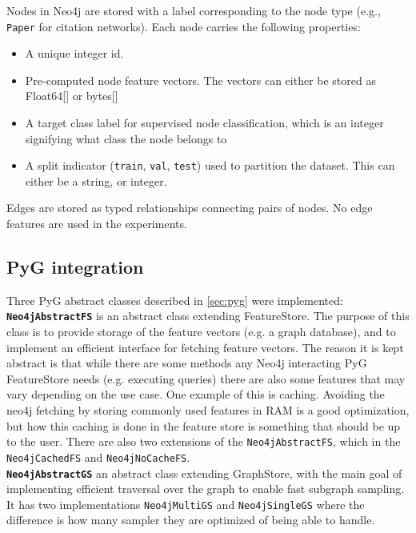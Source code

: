 \documentclass[ oneside,openright,titlepage,numbers=noenddot,headinclude,%
                footinclude=true,cleardoublepage=empty,abstractoff, %
                BCOR=0mm,paper=a4,fontsize=11pt,%
                ngerman,american,%
                ]{scrreprt}
\begin{document}
Nodes in Neo4j are stored with a label corresponding to the node type (e.g.,
\texttt{Paper} for citation networks). Each node carries the following properties:

\begin{itemize}
    \item A unique integer id.
    \item Pre-computed node feature vectors. The vectors can either be stored as Float64[] or bytes[]
    \item A target class label for supervised node classification, which is an integer signifying what class the node belongs to
    \item A split indicator (\texttt{train}, \texttt{val}, \texttt{test}) used to
    partition the dataset. This can either be a string, or integer.
\end{itemize}

Edges are stored as typed relationships connecting pairs of nodes. No edge features
are used in the experiments.


\subsection{PyG integration}\label{sec:pyg_impl}

Three PyG abstract classes described in \ref{sec:pyg} were implemented:\\

\noindent \textbf{\texttt{Neo4jAbstractFS}} is an abstract class extending FeatureStore. The
 purpose of this class is to provide storage of the feature vectors (e.g. a graph database), and
 to implement an efficient interface for fetching feature vectors. The reason it is kept abstract
is that while there are some methods any Neo4j interacting PyG FeatureStore needs (e.g. executing queries)
there are also some features that may vary depending on the use case. One example of this is caching.
Avoiding the neo4j fetching by storing commonly used features in RAM is a good optimization, but how this 
caching is done in the feature store is something that should be up to the user. There are also two extensions of the 
\texttt{Neo4jAbstractFS}, which in the \texttt{Neo4jCachedFS} and \texttt{Neo4jNoCacheFS}.\\

\noindent \textbf{\texttt{Neo4jAbstractGS}} an abstract class extending GraphStore, with the main goal
of implementing efficient traversal over the graph to enable fast subgraph sampling. It has two implementations
\texttt{Neo4jMultiGS} and \texttt{Neo4jSingleGS} where the difference is how many sampler they are 
optimized of being able to handle.\\
\end{document}
